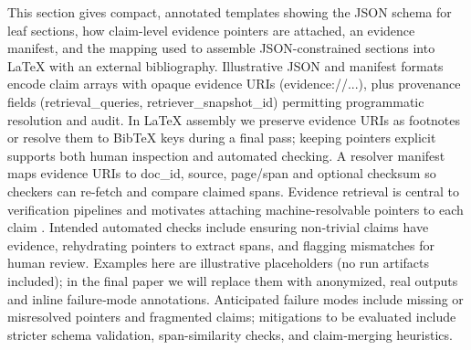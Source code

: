 This section gives compact, annotated templates showing the JSON schema for leaf sections, how claim-level evidence pointers are attached, an evidence manifest, and the mapping used to assemble JSON-constrained sections into LaTeX with an external bibliography.  
Illustrative JSON and manifest formats encode claim arrays with opaque evidence URIs (evidence://...), plus provenance fields (retrieval_queries, retriever_snapshot_id) permitting programmatic resolution and audit.  
In LaTeX assembly we preserve evidence URIs as footnotes or resolve them to BibTeX keys during a final pass; keeping pointers explicit supports both human inspection and automated checking.  
A resolver manifest maps evidence URIs to doc_id, source, page/span and optional checksum so checkers can re-fetch and compare claimed spans.  
Evidence retrieval is central to verification pipelines and motivates attaching machine-resolvable pointers to each claim \cite{web_chen_2023_complex_claim_verification_with_evidence_retriev}.  
Intended automated checks include ensuring non‑trivial claims have evidence, rehydrating pointers to extract spans, and flagging mismatches for human review.  
Examples here are illustrative placeholders (no run artifacts included); in the final paper we will replace them with anonymized, real outputs and inline failure‑mode annotations.  
Anticipated failure modes include missing or misresolved pointers and fragmented claims; mitigations to be evaluated include stricter schema validation, span-similarity checks, and claim‑merging heuristics.